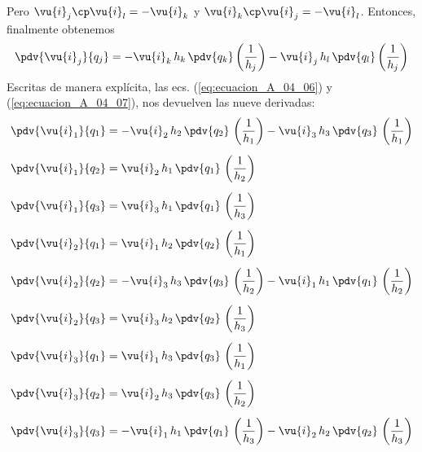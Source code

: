 Pero $\vu{i}_{j} \cp \vu{i}_{l} = - \vu{i}_{k}$ y $\vu{i}_{k} \cp \vu{i}_{j} = - \vu{i}_{l}$. Entonces, finalmente obtenemos
\begin{align}
\pdv{\vu{i}_{j}}{q_{j}} = - \vu{i}_{k} \, h_{k} \, \pdv{q_{k}} \left( \dfrac{1}{h_{j}} \right) - \vu{i}_{j} \, h_{l} \, \pdv{q_{l}} \left( \dfrac{1}{h_{j}} \right)
\label{eq:ecuacion_A_04_07}    
\end{align}
Escritas de manera explícita, las ecs. (\ref{eq:ecuacion_A_04_06}) y (\ref{eq:ecuacion_A_04_07}), nos devuelven las nueve derivadas:
\begin{align}
\begin{aligned}
\pdv{\vu{i}_{1}}{q_{1}} &= - \vu{i}_{2} \, h_{2} \, \pdv{q_{2}} \, \left(\dfrac{1}{h_{1}} \right) - \vu{i}_{3} \, h_{3} \, \pdv{q_{3}} \, \left(\dfrac{1}{h_{1}} \right) \\[0.5em]
\pdv{\vu{i}_{1}}{q_{2}} &= \vu{i}_{2} \, h_{1} \, \pdv{q_{1}} \, \left(\dfrac{1}{h_{2}} \right) \\[0.5em]
\pdv{\vu{i}_{1}}{q_{3}} &= \vu{i}_{3} \, h_{1} \, \pdv{q_{1}} \, \left(\dfrac{1}{h_{3}} \right) \\[0.5em]
\pdv{\vu{i}_{2}}{q_{1}} &= \vu{i}_{1} \, h_{2} \, \pdv{q_{2}} \, \left(\dfrac{1}{h_{1}} \right) \\[0.5em]
\pdv{\vu{i}_{2}}{q_{2}} &= - \vu{i}_{3} \, h_{3} \, \pdv{q_{3}} \, \left(\dfrac{1}{h_{2}} \right) - \vu{i}_{1} \, h_{1} \, \pdv{q_{1}} \, \left(\dfrac{1}{h_{2}} \right) \\[0.5em]
\pdv{\vu{i}_{2}}{q_{3}} &= \vu{i}_{3} \, h_{2} \, \pdv{q_{2}} \, \left(\dfrac{1}{h_{3}} \right) \\[0.5em]
\pdv{\vu{i}_{3}}{q_{1}} &= \vu{i}_{1} \, h_{3} \, \pdv{q_{3}} \, \left(\dfrac{1}{h_{1}} \right) \\[0.5em]
\pdv{\vu{i}_{3}}{q_{2}} &= \vu{i}_{2} \, h_{3} \, \pdv{q_{3}} \, \left(\dfrac{1}{h_{2}} \right) \\[0.5em]
\pdv{\vu{i}_{3}}{q_{3}} &= - \vu{i}_{1} \, h_{1} \, \pdv{q_{1}} \, \left(\dfrac{1}{h_{3}} \right) - \vu{i}_{2} \, h_{2} \, \pdv{q_{2}} \, \left(\dfrac{1}{h_{3}} \right)
\end{aligned}
\label{eq:ecuacion_A_04_08}
\end{align}
